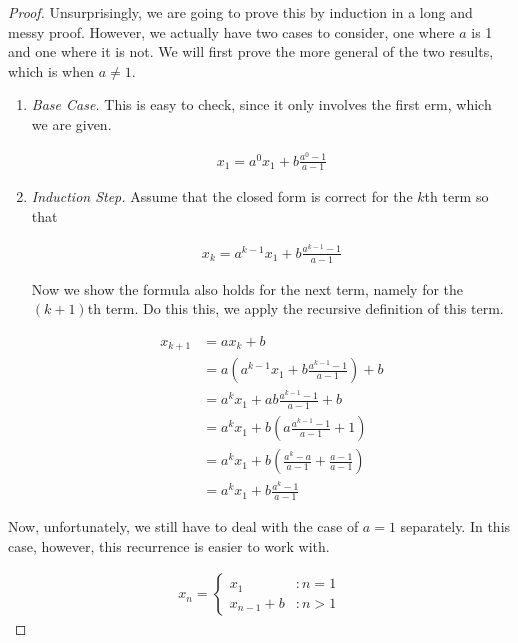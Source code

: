 \begin{proof}
	Unsurprisingly, we are going to prove this by induction in a long and messy proof. However, we actually have two cases to consider, one where $a$ is 1 and one where it is not. We will first prove the more general of the two results, which is when $a \neq 1$.
	
	\begin{enumerate}
		\item \emph{Base Case.} This is easy to check, since it only involves the first erm, which we are given.
		
		\begin{align*}
			x_1 =  a^0 x_1 + b \frac{a^0 - 1}{a - 1}
		\end{align*}
		\item \emph{Induction Step.} Assume that the closed form is correct for the $k$th term so that
		
		\begin{align*}
			x_k = a^{k - 1} x_1 + b \frac{a^{k - 1} - 1}{a - 1}
		\end{align*}
		
		Now we show the formula also holds for the next term, namely for the $(k + 1)$th term. Do this this, we apply the recursive definition of this term.
		
		\begin{align*}
			x_{k + 1} &= a x_k + b \\
			&= a \left( a^{k - 1} x_1 + b \frac{a^{k - 1} - 1}{a - 1} \right) + b \\
			&= a^k x_1 + ab \frac{a^{k - 1} - 1}{a - 1} + b \\
			&= a^k x_1 + b \left( a \frac{a^{k - 1} - 1}{a - 1} + 1 \right) \\
			&= a^k x_1 + b \left( \frac{a^k - a}{a - 1} + \frac{a - 1}{a - 1} \right) \\
			&= a^k x_1 + b \frac{a^k - 1}{a - 1}
		\end{align*}
	\end{enumerate}
	
	Now, unfortunately, we still have to deal with the case of $a = 1$ separately. In this case, however, this recurrence is easier to work with.
	
	\begin{align*}
		x_n =
		\begin{cases}
			x_1 &: n = 1 \\
			x_{n - 1} + b &: n > 1
		\end{cases}
	\end{align*}
	

\end{proof}
